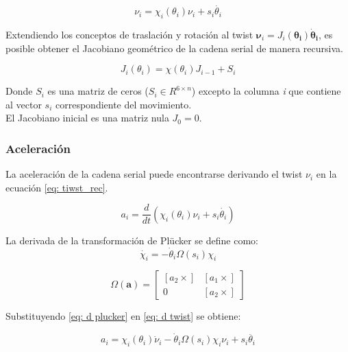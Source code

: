 \begin{equation} \label{eq: tiwst_rec}
\nu_i = \chi_i(\theta_i)\nu_i + s_i\dot{\theta_i}
\end{equation}

Extendiendo los conceptos de traslación y rotación al twist 
$\boldsymbol \nu_i = J_i(\boldsymbol{\theta_i}) \boldsymbol{\dot \theta_i}$, 
es posible obtener el Jacobiano geométrico 
de la cadena serial de manera recursiva. 

\begin{equation}
J_i(\theta_i) = \chi(\theta_i) J_{i-1} + S_i
\end{equation}

Donde $S_i$ es una matriz de ceros 
($S_i \in R^{6\times n}$) excepto la columna 
\emph{i} que contiene al vector $s_i$ correspondiente 
del movimiento.\\
El Jacobiano inicial es una matriz nula $J_0 = 0$.

\subsubsection{Aceleración}

La aceleración de la cadena serial puede 
encontrarse derivando el twist $\nu_i $ en la ecuación 
\eqref{eq: tiwst_rec}.

\begin{equation}\label{eq: d twist}
a_i = \frac{d}{dt} (\chi_i(\theta_i)\nu_i + s_i\dot{\theta_i})
\end{equation}

La derivada de la transformación de Plücker 
se define como:
\begin{equation}\label{eq: d plucker}
\dot{\chi_i} = -\dot \theta_i \Omega(s_i) \chi_i
\end{equation}

\begin{equation}\label{eq: Omega}
 \Omega(\mathbf a) = \begin{bmatrix}
           [a_2 \times] & [a_1 \times] \\
           0 & [a_2 \times]
          \end{bmatrix}
\end{equation}

Substituyendo \eqref{eq: d plucker} 
en \eqref{eq: d twist} se obtiene: 

\begin{equation}\label{eq: acceleration}
a_i = \chi_i(\theta_i)\dot{\nu}_i - \dot \theta_i \Omega(s_i)\chi_i \nu_i+ s_i\ddot{\theta_i}
\end{equation}

